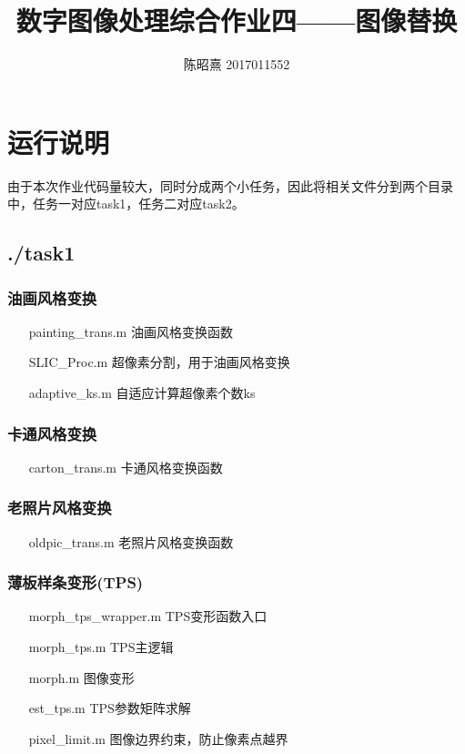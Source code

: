 \documentclass[UTF8]{ctexart}
\begin{document}
\title{数字图像处理综合作业四——图像替换}
\author{陈昭熹 2017011552}
\maketitle
\tableofcontents
\newpage
\section{运行说明}
由于本次作业代码量较大，同时分成两个小任务，因此将相关文件分到两个目录中，任务一对应task1，任务二对应task2。
\subsection{./task1}
\subsubsection{油画风格变换}
\begin{itemize}
    \item[painting\_trans.m]油画风格变换函数
    \item[SLIC\_Proc.m]超像素分割，用于油画风格变换
    \item[adaptive\_ks.m]自适应计算超像素个数ks 
\end{itemize}
\subsubsection{卡通风格变换}
\begin{itemize}
    \item[carton\_trans.m]卡通风格变换函数
\end{itemize}
\subsubsection{老照片风格变换}
\begin{itemize}
    \item[oldpic\_trans.m]老照片风格变换函数
\end{itemize}
\subsubsection{薄板样条变形(TPS)}
\begin{itemize}
    \item[morph\_tps\_wrapper.m]TPS变形函数入口
    \item[morph\_tps.m]TPS主逻辑
    \item[morph.m]图像变形
    \item[est\_tps.m]TPS参数矩阵求解
    \item[pixel\_limit.m]图像边界约束，防止像素点越界    
\end{itemize}
\end{document}
